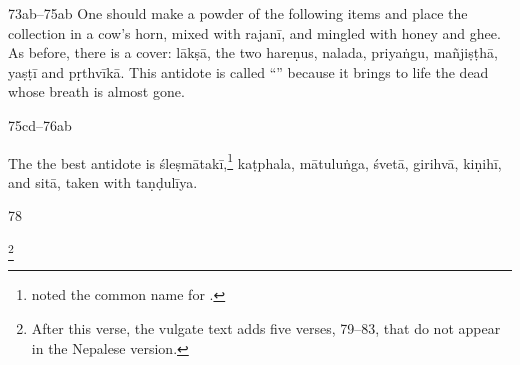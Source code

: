 \begin{translation}
\item [73ab--75ab] One should make a powder of the following items and
place the collection in a cow's horn, mixed with \gls{rajanī}, and mingled with 
honey and ghee.  As before, there is a cover: \gls{lākṣā},
    the two \glspl{hareṇu}, \gls{nalada}, \gls{priyaṅgu}, \gls{mañjiṣṭhā},
    \gls{yaṣṭī} and \gls{pṛthvīkā}. 
        This antidote is
    called “” because it  brings to life the 
    dead whose breath is almost gone.
    
\item [75cd--76ab]

The the best antidote is
\gls{śleṣmātakī},\footnote{ noted the common name 
 for .}
\gls{kaṭphala},
\gls{mātuluṅga},
\gls{śvetā}, %
\gls{girihvā}, %
\gls{kiṇihī},
and \gls{sitā}, 
taken with \gls{taṇḍulīya}.

    





    
    \strut
    \bigskip
    
       
     \item[78] 
     
     \footnote{After this verse, the vulgate text adds five
        verses, 79--83, that do not appear in the Nepalese version.}
\end{translation}    